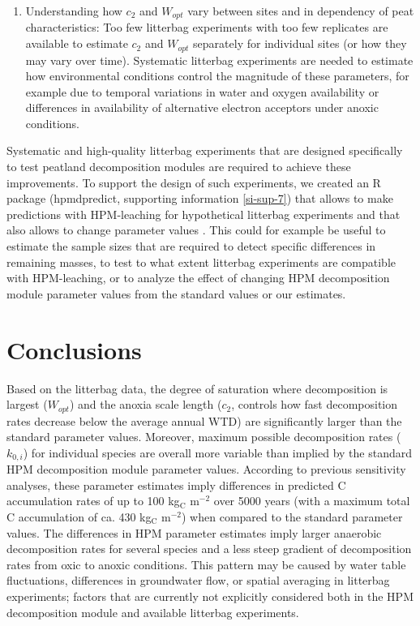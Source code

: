\documentclass[esd, manuscript]{copernicus}
\begin{document}
\begin{enumerate}
\item
  Understanding how \(c_2\) and \(W_{opt}\) vary between sites and in dependency of peat characteristics: Too few litterbag experiments with too few replicates are available to estimate \(c_2\) and \(W_{opt}\) separately for individual sites (or how they may vary over time). Systematic litterbag experiments are needed to estimate how environmental conditions control the magnitude of these parameters, for example due to temporal variations in water and oxygen availability or differences in availability of alternative electron acceptors under anoxic conditions.
\end{enumerate}

Systematic and high-quality litterbag experiments that are designed specifically to test peatland decomposition modules are required to achieve these improvements. To support the design of such experiments, we created an R package (hpmdpredict, supporting information \ref{si-sup-7}) that allows to make predictions with HPM-leaching for hypothetical litterbag experiments and that also allows to change parameter values \citep{Teickner.2025b}. This could for example be useful to estimate the sample sizes that are required to detect specific differences in remaining masses, to test to what extent litterbag experiments are compatible with HPM-leaching, or to analyze the effect of changing HPM decomposition module parameter values from the standard values or our estimates.

\section{Conclusions}

Based on the litterbag data, the degree of saturation where decomposition is largest (\(W_{opt}\)) and the anoxia scale length (\(c_2\), controls how fast decomposition rates decrease below the average annual WTD) are significantly larger than the standard parameter values. Moreover, maximum possible decomposition rates (\(k_{0,i}\)) for individual species are overall more variable than implied by the standard HPM decomposition module parameter values. According to previous sensitivity analyses, these parameter estimates imply differences in predicted C accumulation rates of up to 100 kg\(_\text{C}\) m\(^{-2}\) over 5000 years (with a maximum total C accumulation of ca. 430 kg\(_\text{C}\) m\(^{-2}\)) when compared to the standard parameter values. The differences in HPM parameter estimates imply larger anaerobic decomposition rates for several species and a less steep gradient of decomposition rates from oxic to anoxic conditions. This pattern may be caused by water table fluctuations, differences in groundwater flow, or spatial averaging in litterbag experiments; factors that are currently not explicitly considered both in the HPM decomposition module and available litterbag experiments.
\end{document}
